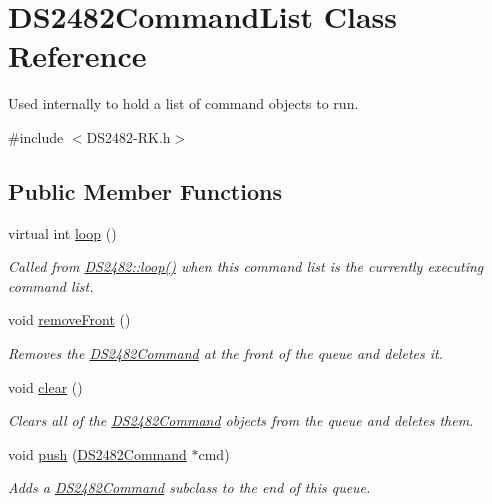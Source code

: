 \hypertarget{class_d_s2482_command_list}{}\section{D\+S2482\+Command\+List Class Reference}
\label{class_d_s2482_command_list}


Used internally to hold a list of command objects to run.  




{\ttfamily \#include $<$D\+S2482-\/\+R\+K.\+h$>$}

\subsection*{Public Member Functions}
\begin{DoxyCompactItemize}
\item 
\mbox{\label{class_d_s2482_command_list_a222351de047a4a66693255ff5fc8979b}} 
virtual int \mbox{\hyperlink{class_d_s2482_command_list_a222351de047a4a66693255ff5fc8979b}{loop}} ()
\begin{DoxyCompactList}\small\item\em Called from \mbox{\hyperlink{class_d_s2482_a28f5f71ae64c58e71dd8cba3c14a2960}{D\+S2482\+::loop()}} when this command list is the currently executing command list. \end{DoxyCompactList}\item 
\mbox{\label{class_d_s2482_command_list_a2b03f6ccc33c3fe52fe7c78dbf6d0d2d}} 
void \mbox{\hyperlink{class_d_s2482_command_list_a2b03f6ccc33c3fe52fe7c78dbf6d0d2d}{remove\+Front}} ()
\begin{DoxyCompactList}\small\item\em Removes the \mbox{\hyperlink{class_d_s2482_command}{D\+S2482\+Command}} at the front of the queue and deletes it. \end{DoxyCompactList}\item 
\mbox{\label{class_d_s2482_command_list_a157da8922c47289cc66a372534eb44a5}} 
void \mbox{\hyperlink{class_d_s2482_command_list_a157da8922c47289cc66a372534eb44a5}{clear}} ()
\begin{DoxyCompactList}\small\item\em Clears all of the \mbox{\hyperlink{class_d_s2482_command}{D\+S2482\+Command}} objects from the queue and deletes them. \end{DoxyCompactList}\item 
void \mbox{\hyperlink{class_d_s2482_command_list_a3586ea3275823c3e5f1463034ac1f7d5}{push}} (\mbox{\hyperlink{class_d_s2482_command}{D\+S2482\+Command}} $\ast$cmd)
\begin{DoxyCompactList}\small\item\em Adds a \mbox{\hyperlink{class_d_s2482_command}{D\+S2482\+Command}} subclass to the end of this queue. \end{DoxyCompactList}\end{DoxyCompactItemize}



